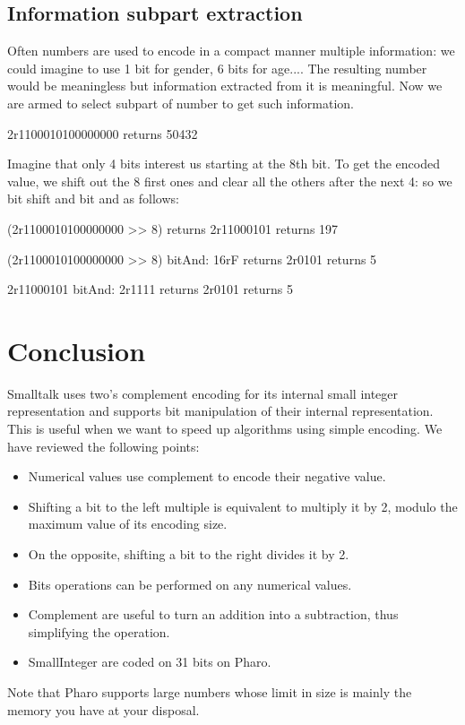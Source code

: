 \documentclass[a4paper,10pt,twoside]{book}
\begin{document}
\subsection*{Information subpart extraction}
Often numbers are used to encode in a compact manner multiple information: we could imagine to use 1 bit for gender, 6 bits for age.... The resulting number would be meaningless but information extracted from it is meaningful.
Now we are armed to select subpart of number to get such information. 

\begin{code}{}
2r1100010100000000 
	returns 50432
\end{code}

Imagine that only 4 bits interest us starting at the 8th bit.
To get the encoded value, we shift out the 8 first ones and clear all the others after the next 4: so we bit shift and bit and as follows:

\begin{code}{}
(2r1100010100000000 >> 8)
	returns 2r11000101
	returns 197

(2r1100010100000000 >> 8) bitAnd: 16rF	
	returns 2r0101	
	returns 5
	
2r11000101 bitAnd: 2r1111
	returns 2r0101	
	returns 5
\end{code}

\section{Conclusion}

Smalltalk uses two's complement encoding for its internal small integer representation and supports  bit manipulation of their internal representation. This is useful when we want to speed up algorithms using simple encoding. We have reviewed the following points:

\begin{itemize}
\item Numerical values use complement to encode their negative value.
\item Shifting a bit to the left multiple is equivalent to multiply it by 2, modulo the maximum value of its encoding size.
\item On the opposite, shifting a bit to the right divides it by 2.
\item Bits operations can be performed on any numerical values.
\item Complement are useful to turn an addition into a subtraction, thus simplifying the operation.
\item SmallInteger are coded on 31 bits on Pharo.
\end{itemize}

Note that Pharo supports large numbers whose limit in size is mainly the memory you have at your disposal. 
\ifx\wholebook\relax\else
   
   
\end{document}
